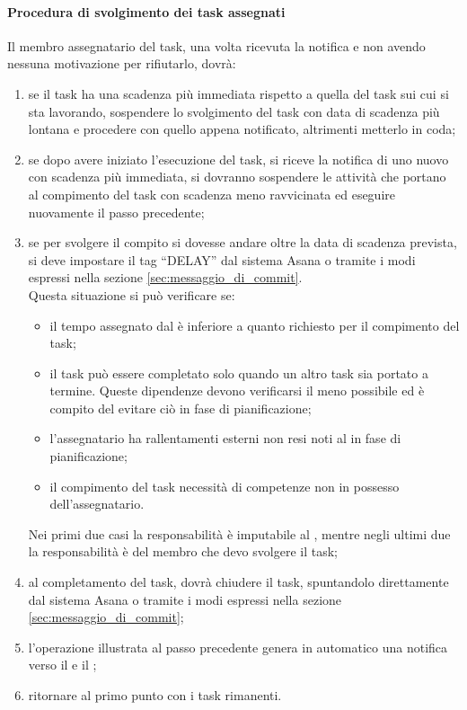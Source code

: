 			\paragraph{Procedura di svolgimento dei task assegnati}
			Il membro assegnatario del task\gloss{}, una volta ricevuta la notifica e non avendo nessuna motivazione per rifiutarlo, dovrà:
				\begin{enumerate}
					\item se il task\gloss{} ha una scadenza più immediata rispetto a quella del task sui cui si sta lavorando, sospendere lo svolgimento del task con data di scadenza più lontana e procedere con quello appena notificato, altrimenti metterlo in coda;
					\item se dopo avere iniziato l'esecuzione del task\gloss{}, si riceve la notifica di uno nuovo con scadenza più immediata, si dovranno sospendere le attività che portano al compimento del task con scadenza meno ravvicinata ed eseguire nuovamente il passo precedente;
					\item se per svolgere il compito si dovesse andare oltre la data di scadenza prevista, si deve impostare il tag ``DELAY'' dal sistema Asana o tramite i modi espressi nella sezione \ref{sec:messaggio_di_commit}. \\
					Questa situazione si può verificare se:
					 	\begin{itemize}
							\item il tempo assegnato dal \roleProjectManager{} è inferiore a quanto richiesto per il compimento del task\gloss{};
							\item il task\gloss{} può essere completato solo quando un altro task sia portato a termine. Queste dipendenze devono verificarsi il meno possibile ed è compito del \roleProjectManager{} evitare ciò in fase di pianificazione;
					 		\item l'assegnatario ha rallentamenti esterni non resi noti al \roleProjectManager{} in fase di pianificazione;
							\item il compimento del task\gloss{} necessità di competenze non in possesso dell'assegnatario.
					 	\end{itemize}
					\noindent
					Nei primi due casi la responsabilità è imputabile al \roleProjectManager, mentre negli ultimi due la responsabilità è del membro che devo svolgere il task\gloss{};
					\item al completamento del task, dovrà chiudere il task, spuntandolo direttamente dal sistema Asana o tramite i modi espressi nella sezione \ref{sec:messaggio_di_commit};
					\item l'operazione illustrata al passo precedente genera in automatico una notifica verso il \roleVerifier{} e il \roleProjectManager;
					\item ritornare al primo punto con i task\gloss{} rimanenti. 

				\end{enumerate}
				
